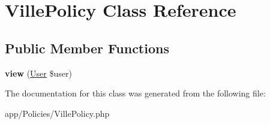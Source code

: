 \hypertarget{class_app_1_1_policies_1_1_ville_policy}{}\section{Ville\+Policy Class Reference}
\label{class_app_1_1_policies_1_1_ville_policy}
\subsection*{Public Member Functions}
\begin{DoxyCompactItemize}
\item 
\mbox{\label{class_app_1_1_policies_1_1_ville_policy_a7d2bfa2eab20cb1de3a321632440c315}} 
{\bfseries view} (\mbox{\hyperlink{class_app_1_1_user}{User}} \$user)
\end{DoxyCompactItemize}


The documentation for this class was generated from the following file\+:\begin{DoxyCompactItemize}
\item 
app/\+Policies/Ville\+Policy.\+php\end{DoxyCompactItemize}
